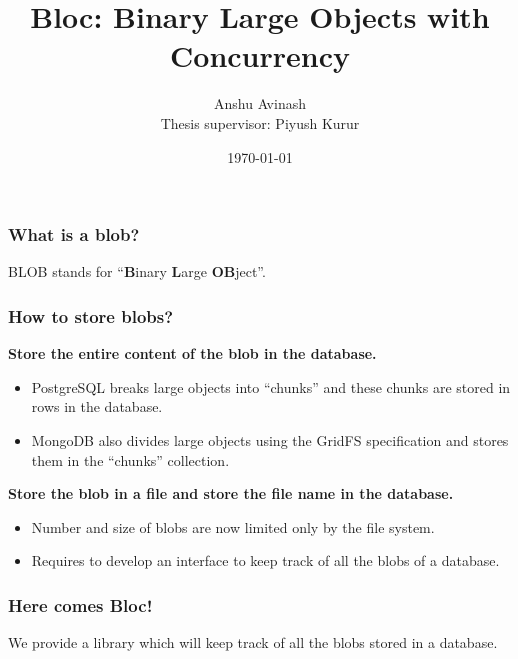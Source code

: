 \documentclass[10pt]{beamer}
\title{Bloc: Binary Large Objects with Concurrency}
\subtitle{}
\date{\today}
\author{Anshu Avinash \\
  Thesis supervisor: Piyush Kurur}
\institute{Department of CSE, IIT Kanpur}
\begin{document}
\maketitle

\begin{frame}
  \frametitle{What is a blob?}

  BLOB stands for ``\textbf{B}inary \textbf{L}arge \textbf{OB}ject''.
  \begin{center}
  \end{center}

\end{frame}

\begin{frame}[allowframebreaks]
  \frametitle{How to store blobs?}

  \textbf {Store the entire content of the blob in the database.}
  \begin{itemize}
    \item PostgreSQL breaks large objects into ``chunks'' and these chunks are
      stored in rows in the database.
    \item MongoDB also divides large objects using the GridFS specification and stores
      them in the ``chunks'' collection.
  \end{itemize}

  \framebreak

  \textbf {Store the blob in a file and store the file name in the database.}
  \begin{itemize}
    \item Number and size of blobs are now limited only by the file system.
    \item Requires to develop an interface to keep track of all the blobs of a database.
  \end{itemize}
\end{frame}

\begin{frame}
  \frametitle{Here comes Bloc!}

  We provide a library which will keep track of all the blobs stored in a database. \\

\end{frame}
\end{document}
